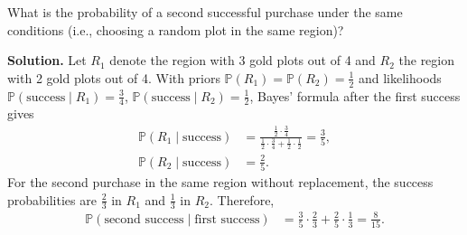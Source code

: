 \documentclass{article}
\begin{document}
What is the probability of a second successful purchase under the same conditions (i.e., choosing a random plot in the same region)?

\textbf{Solution.} Let $R_1$ denote the region with 3 gold plots out of 4 and $R_2$ the region with 2 gold plots out of 4. With priors $\mathbb{P}(R_1)=\mathbb{P}(R_2)=\tfrac12$ and likelihoods $\mathbb{P}(\text{success}\mid R_1)=\tfrac34$, $\mathbb{P}(\text{success}\mid R_2)=\tfrac12$, Bayes' formula after the first success gives
\begin{align*}
\mathbb{P}(R_1\mid \text{success})&=\frac{\tfrac12\cdot\tfrac34}{\tfrac12\cdot\tfrac34+\tfrac12\cdot\tfrac12}=\frac{3}{5}, \\
\mathbb{P}(R_2\mid \text{success})&=\frac{2}{5}.
\end{align*}
For the second purchase in the same region without replacement, the success probabilities are $\tfrac{2}{3}$ in $R_1$ and $\tfrac{1}{3}$ in $R_2$. Therefore,
\begin{align*}
\mathbb{P}(\text{second success}\mid \text{first success})
&=\frac{3}{5}\cdot\frac{2}{3}+\frac{2}{5}\cdot\frac{1}{3}=\frac{8}{15}.
\end{align*}
\end{document}
